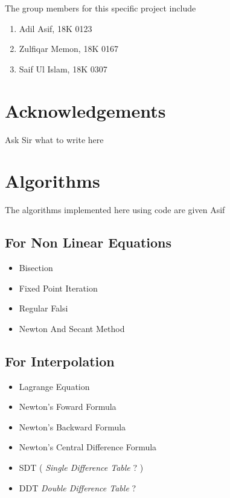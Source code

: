 \documentclass{article}
\begin{document}
        \begin{small}

            The group members for this specific project include

            \begin{enumerate}
                \item Adil Asif, 18K 0123
                \item Zulfiqar Memon, 18K 0167
                \item Saif Ul Islam, 18K 0307
            \end{enumerate}

        \end{small}

    \section*{Acknowledgements}

        Ask Sir what to write here

    \section*{Algorithms}

        \begin{small}

            The algorithms implemented here using code are given Asif

            \subsection*{For Non Linear Equations}

                \begin{itemize}
                    \item Bisection
                    \item Fixed Point Iteration
                    \item Regular Falsi
                    \item Newton And Secant Method
                \end{itemize}

            \subsection*{For Interpolation}

                \begin{itemize}
                    \item Lagrange Equation
                    \item Newton's Foward Formula
                    \item Newton's Backward Formula
                    \item Newton's Central Difference Formula
                    \item SDT ( \emph{Single Difference Table} ? )
                    \item DDT { \emph{Double Difference Table} ? }
                \end{itemize}

        \end{small}
\end{document}
